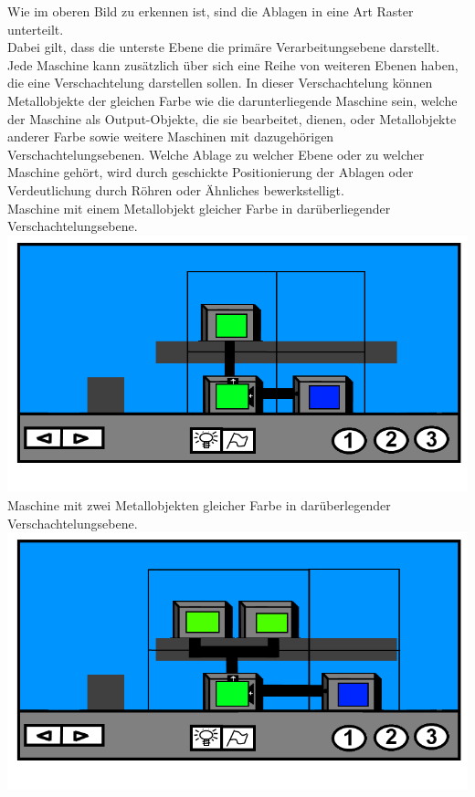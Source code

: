 \documentclass{scrartcl}
\begin{document}
\begin{description}
		\begin{minipage}{1\textwidth}
			Wie im oberen Bild zu erkennen ist, sind die Ablagen in eine Art Raster unterteilt.\\
			Dabei gilt, dass die unterste Ebene die primäre Verarbeitungsebene darstellt. Jede Maschine kann zusätzlich über sich eine Reihe von weiteren Ebenen haben, die eine Verschachtelung darstellen sollen. In dieser Verschachtelung können Metallobjekte der gleichen Farbe wie die darunterliegende Maschine sein, welche der Maschine als Output-Objekte, die sie bearbeitet, dienen, oder Metallobjekte anderer Farbe sowie weitere Maschinen mit dazugehörigen Verschachtelungsebenen. Welche Ablage zu welcher Ebene oder zu welcher Maschine gehört, wird durch geschickte Positionierung der Ablagen oder Verdeutlichung durch Röhren oder Ähnliches bewerkstelligt.\\
			Maschine mit einem Metallobjekt gleicher Farbe in darüberliegender Verschachtelungsebene.\\ 
			\includegraphics[scale=0.5]{assets/LevelVerarbeitungBsp}\\
			Maschine mit zwei Metallobjekten gleicher Farbe in darüberlegender Verschachtelungsebene.\\
			\includegraphics[scale=0.5]{assets/LevelBsp2Out}\\
		\end{minipage}
		

\end{description}
\end{document}
